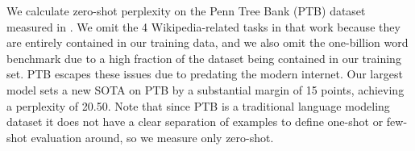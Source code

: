 We calculate zero-shot perplexity on the Penn Tree Bank (PTB) \cite{marcus1994penn} dataset measured in \cite{radford2019language}. We omit the 4 Wikipedia-related tasks in that work because they are entirely contained in our training data, and we also omit the one-billion word benchmark due to a high fraction of the dataset being contained in our training set.  PTB escapes these issues due to predating the modern internet. Our largest model sets a new SOTA on PTB by a substantial margin of 15 points, achieving a perplexity of 20.50. Note that since PTB is a traditional language modeling dataset it does not have a clear separation of examples to define one-shot or few-shot evaluation around, so we measure only zero-shot.


